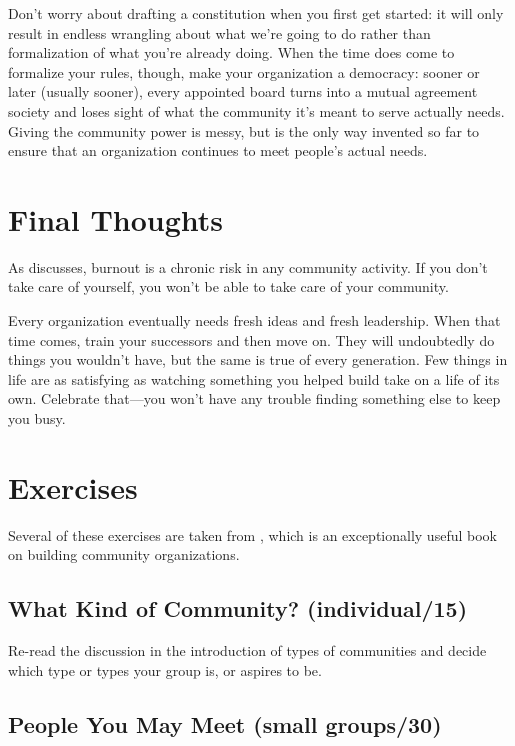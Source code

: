 Don't worry about drafting a constitution when you first get started: it
will only result in endless wrangling about what we're going to do
rather than formalization of what you're already doing. When the time
does come to formalize your rules, though, make your organization a
democracy: sooner or later (usually sooner), every appointed board turns
into a mutual agreement society and loses sight of what the community
it's meant to serve actually needs. Giving the community power is
messy, but is the only way invented so far to ensure that an
organization continues to meet people's actual needs.

\section{Final Thoughts}\label{s:community-final}

As \cite{Pign2016} discusses, burnout is a chronic risk in any
community activity. If you don't take care of yourself, you won't be
able to take care of your community.

Every organization eventually needs fresh ideas and fresh leadership.
When that time comes, train your successors and then move on. They will
undoubtedly do things you wouldn't have, but the same is true of every
generation. Few things in life are as satisfying as watching something
you helped build take on a life of its own. Celebrate that---you won't
have any trouble finding something else to keep you busy.

\section{Exercises}\label{s:community-exercises}

Several of these exercises are taken from \cite{Brow2007}, which is
an exceptionally useful book on building community organizations.

\subsection{What Kind of Community? (individual/15)}\label{what-kind-of-community-individual15}

Re-read the discussion in the introduction of types of communities and
decide which type or types your group is, or aspires to be.

\subsection{People You May Meet (small groups/30)}\label{people-you-may-meet-small-groups30}

